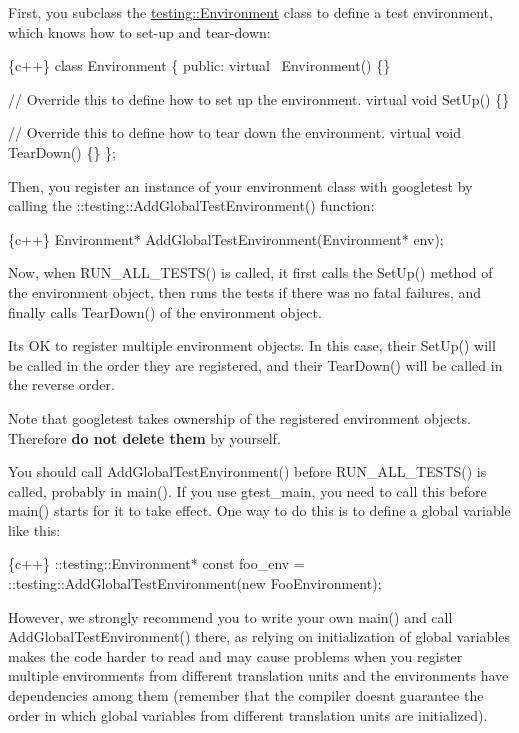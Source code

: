 First, you subclass the {\ttfamily \hyperlink{classtesting_1_1Environment}{testing\+::\+Environment}} class to define a test environment, which knows how to set-\/up and tear-\/down\+:


\begin{DoxyCode}
\{c++\}
class Environment \{
 public:
  virtual ~Environment() \{\}

  // Override this to define how to set up the environment.
  virtual void SetUp() \{\}

  // Override this to define how to tear down the environment.
  virtual void TearDown() \{\}
\};
\end{DoxyCode}


Then, you register an instance of your environment class with googletest by calling the {\ttfamily \+::testing\+::\+Add\+Global\+Test\+Environment()} function\+:


\begin{DoxyCode}
\{c++\}
Environment* AddGlobalTestEnvironment(Environment* env);
\end{DoxyCode}


Now, when {\ttfamily R\+U\+N\+\_\+\+A\+L\+L\+\_\+\+T\+E\+S\+T\+S()} is called, it first calls the {\ttfamily Set\+Up()} method of the environment object, then runs the tests if there was no fatal failures, and finally calls {\ttfamily Tear\+Down()} of the environment object.

It\textquotesingle{}s OK to register multiple environment objects. In this case, their {\ttfamily Set\+Up()} will be called in the order they are registered, and their {\ttfamily Tear\+Down()} will be called in the reverse order.

Note that googletest takes ownership of the registered environment objects. Therefore {\bfseries do not delete them} by yourself.

You should call {\ttfamily Add\+Global\+Test\+Environment()} before {\ttfamily R\+U\+N\+\_\+\+A\+L\+L\+\_\+\+T\+E\+S\+T\+S()} is called, probably in {\ttfamily main()}. If you use {\ttfamily gtest\+\_\+main}, you need to call this before {\ttfamily main()} starts for it to take effect. One way to do this is to define a global variable like this\+:


\begin{DoxyCode}
\{c++\}
::testing::Environment* const foo\_env =
    ::testing::AddGlobalTestEnvironment(new FooEnvironment);
\end{DoxyCode}


However, we strongly recommend you to write your own {\ttfamily main()} and call {\ttfamily Add\+Global\+Test\+Environment()} there, as relying on initialization of global variables makes the code harder to read and may cause problems when you register multiple environments from different translation units and the environments have dependencies among them (remember that the compiler doesn\textquotesingle{}t guarantee the order in which global variables from different translation units are initialized).

